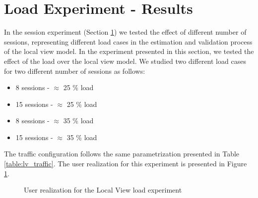 \clearpage
\section{Load Experiment - Results} \label{sec:lv_load_results}
In the session experiment (Section \ref{sec:lv_load_results}) we tested the effect of different number of sessions, representing different load cases in the estimation and validation process of the local view model. In the experiment presented in this section, we tested the effect of the load over the local view model. We studied two different load cases for two different number of sessions as follows:

\begin{itemize}
	\item 8 sessions - $\approx$ 25 \% load
	\item 15 sessions - $\approx$ 25 \% load
	\item 8 sessions - $\approx$ 35 \% load
	\item 15 sessions - $\approx$ 35 \% load
\end{itemize}

The traffic configuration follows the same parametrization presented in Table \ref{table:lv_traffic}. The user realization for this experiment is presented in Figure \ref{fig:lv_user_realization2}.

\begin{figure}[h!]
	\centering
	\caption{User realization for the Local View load experiment}
	\label{fig:lv_user_realization2}
\end{figure}

